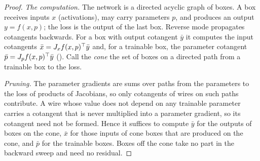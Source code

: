 \begin{proof}
\emph{The computation.} The network is a directed acyclic graph of boxes. A box receives inputs $x$ (activations), may carry
parameters $p$, and produces an output $y=f(x,p)$; the loss is the output of the last box. Reverse mode propagates
cotangents backwards. For a box with output cotangent $\bar y$ it computes the input cotangents $\bar x=J_xf(x,p)^{\top}\bar y$
and, for a trainable box, the parameter cotangent $\bar p=J_pf(x,p)^{\top}\bar y$ (). Call the \emph{cone} the set of
boxes on a directed path from a trainable box to the loss.

\emph{Pruning.} The parameter gradients are sums over paths from the parameters to the loss of products of Jacobians, so
only cotangents of wires on such paths contribute. A wire whose value does not depend on any trainable parameter carries a
cotangent that is never multiplied into a parameter gradient, so its cotangent need not be formed. Hence it suffices to
compute $\bar y$ for the outputs of boxes on the cone, $\bar x$ for those inputs of cone boxes that are produced on the
cone, and $\bar p$ for the trainable boxes. Boxes off the cone take no part in the backward sweep and need no residual.


\end{proof}
